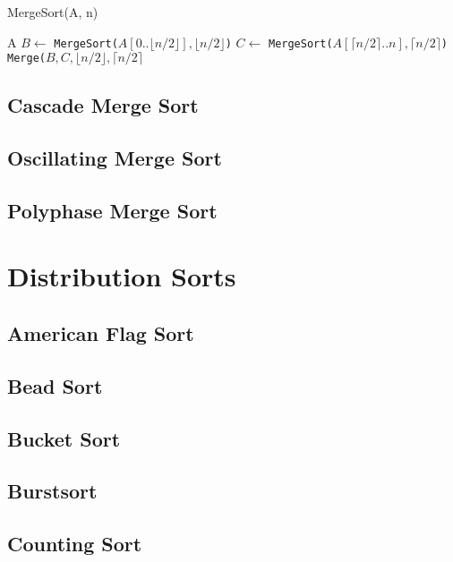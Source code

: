 				\begin{algorithm}[h]
					\caption{MergeSort(A, n)}
					\begin{algorithmic}[1]
							\Return A
						\Else
							\State $B \gets$ \texttt{MergeSort($A[0 .. \lfloor n/2 \rfloor], \lfloor n/2 \rfloor$)}
							\State $C \gets$ \texttt{MergeSort($A[\lceil n/2 \rceil .. n], \lceil n/2 \rceil$)}
						\EndIf
						\Return \texttt{Merge($B, C, \lfloor n/2 \rfloor, \lceil n/2 \rceil$}
					\end{algorithmic}
				\end{algorithm}

			\subsection{Cascade Merge Sort}

			\subsection{Oscillating Merge Sort}

			\subsection{Polyphase Merge Sort}

		\section{Distribution Sorts}
			\subsection{American Flag Sort}

			\subsection{Bead Sort}

			\subsection{Bucket Sort}

			\subsection{Burstsort}

			\subsection{Counting Sort}

